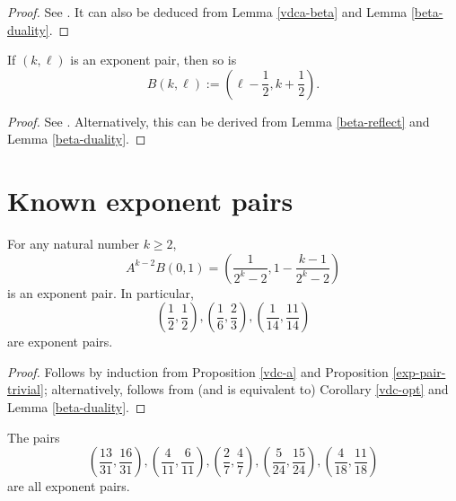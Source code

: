 \begin{proof} See \cite[Lemma 2.8]{ivic}. It can also be deduced from Lemma \ref{vdca-beta} and Lemma \ref{beta-duality}.
\end{proof}

\begin{proposition}\label{vdc-b}  If $(k,\ell)$ is an exponent pair, then so is
    $$B(k,\ell) := \left(\ell-\frac{1}{2}, k+\frac{1}{2}\right).$$
\end{proposition}

\literature
{}

\begin{proof}  See \cite[Lemma 2.9]{ivic}.  Alternatively, this can be derived from Lemma \ref{beta-reflect} and Lemma \ref{beta-duality}.
\end{proof}


\section{Known exponent pairs}


\begin{proposition}\label{vdc-class} For any natural number $k \geq 2$,
    $$ A^{k-2} B(0,1) = \left( \frac{1}{2^k-2}, 1 - \frac{k-1}{2^k-2} \right)$$
    is an exponent pair.  In particular,
    $$ \left(\frac{1}{2}, \frac{1}{2}\right), \left(\frac{1}{6}, \frac{2}{3}\right), \left(\frac{1}{14}, \frac{11}{14}\right)$$
    are exponent pairs.
    \end{proposition}

    \begin{proof} Follows by induction from Proposition \ref{vdc-a} and Proposition \ref{exp-pair-trivial}; alternatively, follows from (and is equivalent to) Corollary \ref{vdc-opt} and Lemma \ref{beta-duality}.
    \end{proof}

\derived
{}

\begin{corollary}\label{add-exponential}  The pairs
$$ \left(\frac{13}{31}, \frac{16}{31}\right), \left(\frac{4}{11},\frac{6}{11}\right), \left(\frac{2}{7},\frac{4}{7}\right), \left(\frac{5}{24},\frac{15}{24}\right), \left(\frac{4}{18},\frac{11}{18}\right)$$
are all exponent pairs.
\end{corollary}

